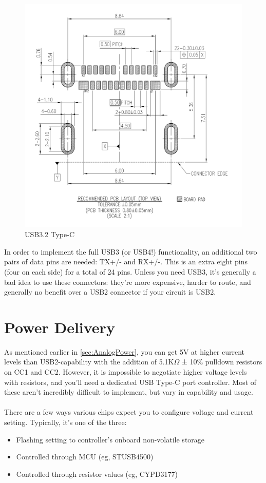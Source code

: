 \documentclass[12pt]{article}
\begin{document}
\begin{figure}[h]
	\centering
	\includegraphics[width=.8\linewidth]{Amphenol-USB3.2-Type-C.png}
	\caption{USB3.2 Type-C\protect\footnotemark}
	\label{fig:usb-c-pinout-usb3.2-amphenol}
\end{figure}


\noindent
In order to implement the full USB3 (or USB4!) functionality, an additional two pairs of data pins are needed: TX+/- and RX+/-. This is an extra eight pins (four on each side) for a total of 24 pins. Unless you need USB3, it's generally a bad idea to use these connectors: they're more expensive, harder to route, and generally no benefit over a USB2 connector if your circuit is USB2. 


\newpage
\section{Power Delivery}

As mentioned earlier in \ref{sec:AnalogPower}, you can get 5V at higher current levels than USB2-capability with the addition of 5.1K$\Omega$ ± 10\% pulldown resistors on CC1 and CC2. However, it is impossible to negotiate higher voltage levels with resistors, and you'll need a dedicated USB Type-C port controller. Most of these aren't incredibly difficult to implement, but vary in capability and usage. \\\\
\noindent
There are a few ways various chips expect you to configure voltage and current setting. Typically, it's one of the three:
\begin{itemize}
	\item Flashing setting to controller's onboard non-volatile storage
	\item Controlled through MCU (eg, STUSB4500)
	\item Controlled through resistor values (eg, CYPD3177)\\
\end{itemize}
\end{document}
